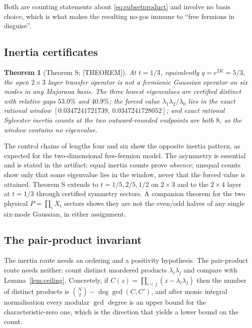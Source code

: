\documentclass[11pt]{article}
\newtheorem{theorem}{Theorem}[section]
\theoremstyle{definition}
\begin{document}
Both are counting statements about \eqref{eq:subsetproduct} and involve no basis choice, which is
what makes the resulting no-gos immune to ``free fermions in disguise''.

\subsection{Inertia certificates}
\begin{theorem}[Theorem S; {[THEOREM]}]\label{thm:S}
At $t=1/3$, equivalently $q=e^{2K}=5/3$, the open $2\times3$ layer transfer operator is not a
fermionic Gaussian operator on six modes in any Majorana basis. The three lowest eigenvalues are
certified distinct with relative gaps $53.0\%$ and $40.9\%$; the forced value
$\lambda_1\lambda_2/\lambda_0$ lies in the exact rational window
$[0.0347241721739,\ 0.0347241728052]$; and exact rational Sylvester inertia counts at the two
outward-rounded endpoints are both $8$, so the window contains no eigenvalue.
\end{theorem}

The control chains of lengths four and six show the opposite inertia pattern, as expected for the
two-dimensional free-fermion model. The asymmetry is essential and is stated in the artifact: equal
inertia counts prove \emph{absence}; unequal counts show only that some eigenvalue lies in the
window, never that the forced value is attained. Theorem S extends to $t=1/5,2/5,1/2$ on $2\times3$
and to the $2\times4$ layer at $t=1/3$ through certified symmetry sectors. A companion theorem for
the two physical $P=\prod_iX_i$ sectors shows they are not the even/odd halves of any single six-mode
Gaussian, in either assignment.

\subsection{The pair-product invariant}
The inertia route needs an ordering and a positivity hypothesis. The pair-product route needs
neither: count distinct unordered products $\lambda_i\lambda_j$ and compare with
Lemma~\ref{lem:ceiling}. Concretely, if $C(z)=\prod_{i<j}(z-\lambda_i\lambda_j)$ then the number of
distinct products is $\binom{N}{2}-\deg\gcd(C,C')$, and after monic integral normalisation every
modular $\gcd$ degree is an upper bound for the characteristic-zero one, which is the direction that
yields a lower bound on the count.
\end{document}
